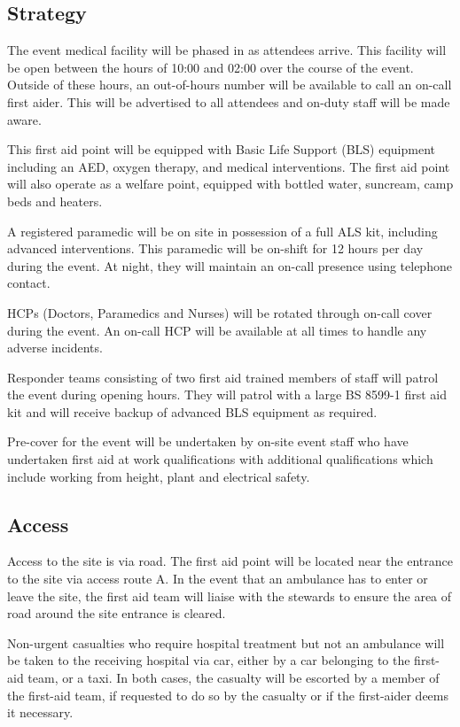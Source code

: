 \subsection{Strategy}
The event medical facility will be phased in as attendees arrive. This facility will
be open between the hours of 10:00 and 02:00 over the course of the event. Outside
of these hours, an out-of-hours number will be available to call an on-call first aider.
This will be advertised to all attendees and on-duty staff will be made aware.

This first aid point will be equipped with Basic Life Support (BLS) equipment including
an AED, oxygen therapy, and medical interventions. The first aid point will also operate as
a welfare point, equipped with bottled water, suncream, camp beds and heaters.

A registered paramedic will be on site in possession of a full ALS kit, including advanced
interventions. This paramedic will be on-shift for 12 hours per day during the event. At
night, they will maintain an on-call presence using telephone contact.

HCPs (Doctors, Paramedics and Nurses) will be rotated through on-call cover during the
event. An on-call HCP will be available at all times to handle any adverse incidents.

Responder teams consisting of two first aid trained members of staff will patrol the event
during opening hours. They will patrol with a large BS 8599-1 first aid kit and will receive
backup of advanced BLS equipment as required.

Pre-cover for the event will be undertaken by on-site event staff who have undertaken first aid
at work qualifications with additional qualifications which include working from height, plant
and electrical safety.

\subsection{Access}

Access to the site is via road. The first aid point will be located near the
entrance to the site via access route A. In the event that an ambulance has
to enter or leave the site, the first aid team will liaise with the stewards to ensure
the area of road around the site entrance is cleared.

Non-urgent casualties who require hospital treatment but not an ambulance will
be taken to the receiving hospital via car, either by a car belonging to the
first-aid team, or a taxi. In both cases, the casualty will be escorted by a
member of the first-aid team, if requested to do so by the casualty or if the
first-aider deems it necessary.

